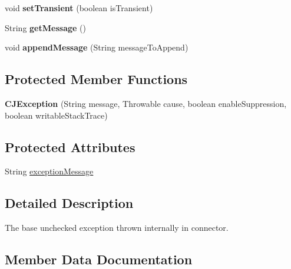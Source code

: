 \begin{DoxyCompactItemize}
void {\bfseries set\+Transient} (boolean is\+Transient)
\item 
\mbox{\label{classcom_1_1mysql_1_1cj_1_1exceptions_1_1_c_j_exception_a9918a82c000e0061033895fbc12126be}} 
String {\bfseries get\+Message} ()
\item 
\mbox{\label{classcom_1_1mysql_1_1cj_1_1exceptions_1_1_c_j_exception_a7848d822e954b8d5d2e5a5619b45d8b2}} 
void {\bfseries append\+Message} (String message\+To\+Append)
\end{DoxyCompactItemize}
\subsection*{Protected Member Functions}
\begin{DoxyCompactItemize}
\item 
\mbox{\label{classcom_1_1mysql_1_1cj_1_1exceptions_1_1_c_j_exception_a8ecb5eccfadefa15219ee2a5db4abc03}} 
{\bfseries C\+J\+Exception} (String message, Throwable cause, boolean enable\+Suppression, boolean writable\+Stack\+Trace)
\end{DoxyCompactItemize}
\subsection*{Protected Attributes}
\begin{DoxyCompactItemize}
\item 
String \mbox{\hyperlink{classcom_1_1mysql_1_1cj_1_1exceptions_1_1_c_j_exception_ae9a784b6d12d77b129eed76d46509be9}{exception\+Message}}
\end{DoxyCompactItemize}


\subsection{Detailed Description}
The base unchecked exception thrown internally in connector. 

\subsection{Member Data Documentation}
\mbox{\label{classcom_1_1mysql_1_1cj_1_1exceptions_1_1_c_j_exception_ae9a784b6d12d77b129eed76d46509be9}} 
